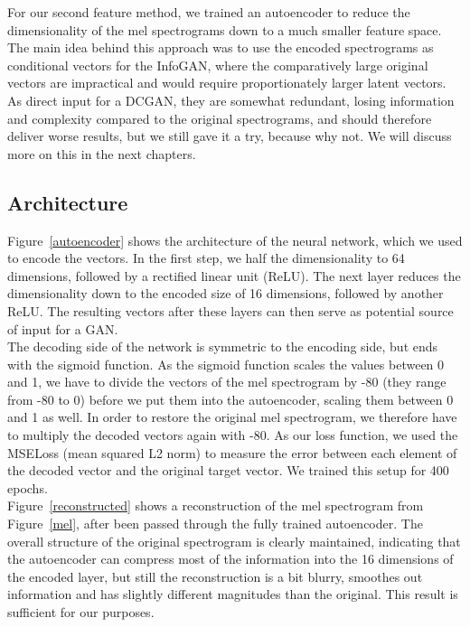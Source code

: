     For our second feature method, we trained an autoencoder to reduce the dimensionality of the mel spectrograms down to a much smaller feature space.
    The main idea behind this approach was to use the encoded spectrograms as conditional vectors for the InfoGAN, where the comparatively large original vectors are impractical and would require proportionately larger latent vectors.
    As direct input for a DCGAN, they are somewhat redundant, losing information and complexity compared to the original spectrograms, and should therefore deliver worse results, but we still gave it a try, because why not.
    We will discuss more on this in the next chapters.\\

    \subsection{Architecture}
    \indent Figure~\ref{autoencoder} shows the architecture of the neural network, which we used to encode the vectors. In the first step, we half the dimensionality to 64 dimensions, followed by a rectified linear unit (ReLU).
    The next layer reduces the dimensionality down to the encoded size of 16 dimensions, followed by another ReLU. 
    The resulting vectors after these layers can then serve as potential source of input for a GAN.\\
    \indent The decoding side of the network is symmetric to the encoding side, but ends with the sigmoid function. 
    As the sigmoid function scales the values between 0 and 1, we have to divide the vectors of the mel spectrogram by -80 (they range from -80 to 0) before we put them into the autoencoder, scaling them between 0 and 1 as well. 
    In order to restore the original mel spectrogram, we therefore have to multiply the decoded vectors again with -80.
    As our loss function, we used the MSELoss (mean squared L2 norm) to measure the error between each element of the decoded vector and the original target vector. 
    We trained this setup for 400 epochs.\\
    Figure~\ref{reconstructed} shows a reconstruction of the mel spectrogram from Figure~\ref{mel}, after been passed through the fully trained autoencoder.
    The overall structure of the original spectrogram is clearly maintained, indicating that the autoencoder can compress most of the information into the 16 dimensions of the encoded layer, but still the reconstruction is a bit blurry, smoothes out information and has slightly different magnitudes than the original.
    This result is sufficient for our purposes.

